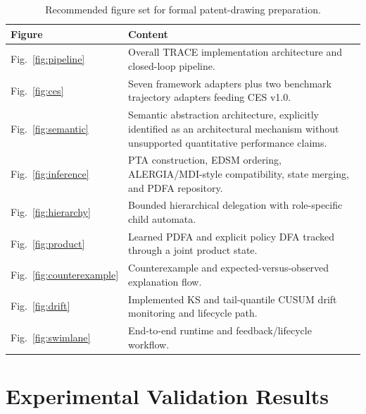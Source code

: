\documentclass[11pt,a4paper]{article}
\begin{document}
\begin{table}[!htbp]
\centering
\small
\begin{tabular}{L{1.8cm} L{12.3cm}}
\toprule
\textbf{Figure} & \textbf{Content} \\
\midrule

Fig.~\ref{fig:pipeline} &
Overall TRACE implementation architecture and closed-loop pipeline. \\

Fig.~\ref{fig:ces} &
Seven framework adapters plus two benchmark trajectory adapters feeding CES v1.0. \\

Fig.~\ref{fig:semantic} &
Semantic abstraction architecture, explicitly identified as an architectural mechanism
without unsupported quantitative performance claims. \\

Fig.~\ref{fig:inference} &
PTA construction, EDSM ordering, ALERGIA/MDI-style compatibility, state merging, and
PDFA repository. \\

Fig.~\ref{fig:hierarchy} &
Bounded hierarchical delegation with role-specific child automata. \\

Fig.~\ref{fig:product} &
Learned PDFA and explicit policy DFA tracked through a joint product state. \\

Fig.~\ref{fig:counterexample} &
Counterexample and expected-versus-observed explanation flow. \\

Fig.~\ref{fig:drift} &
Implemented KS and tail-quantile CUSUM drift monitoring and lifecycle path. \\

Fig.~\ref{fig:swimlane} &
End-to-end runtime and feedback/lifecycle workflow. \\

\bottomrule
\end{tabular}

\caption{Recommended figure set for formal patent-drawing preparation.}
\end{table}

\section{Experimental Validation Results}
\end{document}
